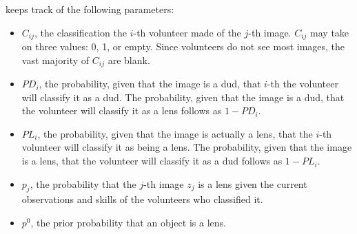 \documentclass[useAMS,usenatbib,a4paper]{mn2e}
\begin{document}
\sw keeps track of the following parameters:
\begin{itemize}
  \item{$C_{ij}$, the classification the $i$-th volunteer made of the $j$-th
      image. $C_{ij}$ may take on three values:
      0, 1, or empty. Since volunteers do not see most images, the vast
    majority of $C_{ij}$ are blank.}
    \item{$PD_{i}$, the probability, given that the image is a dud, that
        $i$-th the volunteer will classify it as a dud. The
      probability, given that the image is a dud, that the volunteer will
    classify it as a lens follows as $1 - PD_{i}$.}
  \item{$PL_{i}$, the probability, given that the image is actually a
      lens, that the $i$-th volunteer will classify it as being a lens. The
      probability, given that the image is a lens, that the volunteer will
    classify it as a dud follows as $1 - PL_{i}$.}
  \item{$p_j$, the probability that
      the $j$-th image $z_{j}$ is a lens given the current observations and skills of the
  volunteers who classified it.}
  \item{$p^{0}$, the prior probability that an object is a lens.}
\end{itemize}

\end{document}
